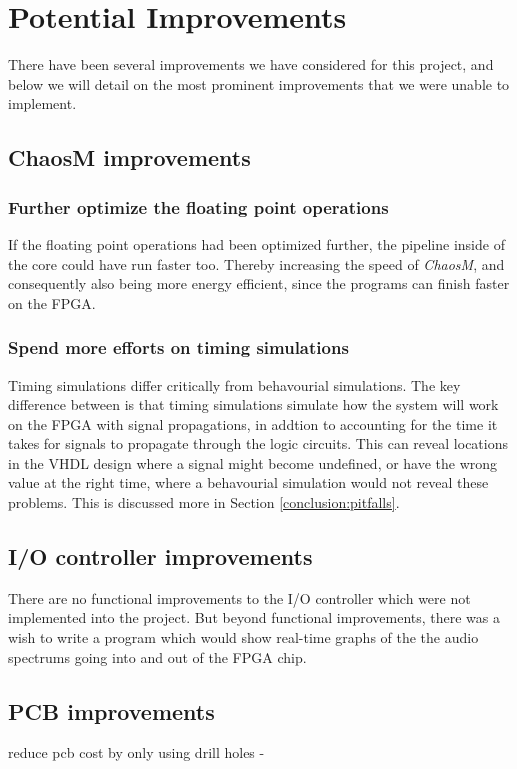 \section{Potential Improvements}

There have been several improvements we have considered for this project, and
below we will detail on the most prominent improvements that we were unable to
implement.

\subsection{ChaosM improvements}
\subsubsection{Further optimize the floating point operations}

If the floating point operations had been optimized further, the pipeline inside
of the core could have run faster too. Thereby increasing the speed of
\textit{ChaosM}, and consequently also being more energy efficient, since the
programs can finish faster on the FPGA.

\subsubsection{Spend more efforts on timing simulations}

Timing simulations differ critically from behavourial simulations. The key
difference between is that timing simulations simulate how the system will work
on the FPGA with signal propagations, in addtion to accounting for the time it
takes for signals to propagate through the logic circuits. This can reveal
locations in the VHDL design where a signal might become undefined, or have the
wrong value at the right time, where a behavourial simulation would not reveal
these problems. This is discussed more in Section \ref{conclusion:pitfalls}.

\subsection{I/O controller improvements}

There are no functional improvements to the I/O controller which were not
implemented into the project. But beyond functional improvements, there was a
wish to write a program which would show real-time graphs of the the audio
spectrums going into and out of the FPGA chip.

\subsection{PCB improvements}
reduce pcb cost by only using drill holes -


